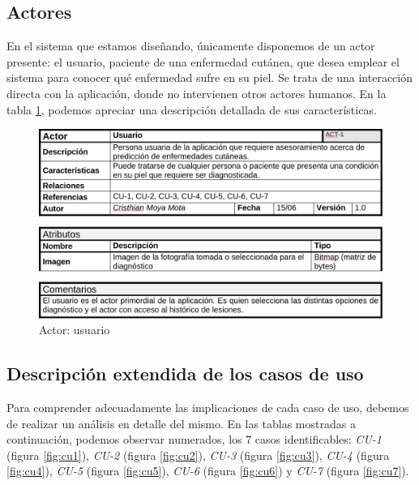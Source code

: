 \subsection{Actores}

En el sistema que estamos diseñando, únicamente disponemos de un actor presente: el usuario, paciente de una enfermedad cutánea, que desea emplear el sistema para conocer qué enfermedad sufre en su piel. Se trata de una interacción directa con la aplicación, donde no intervienen otros actores humanos. En la tabla \ref{fig:actorusuario}, podemos apreciar una descripción detallada de sus características.

  \begin{figure}[H]
	\centering
	\includegraphics[scale = 0.2]{imagenes/tablausuario.png}
	\caption{Actor: usuario}
	\label{fig:actorusuario}
\end{figure}

\subsection	{Descripción extendida de los casos de uso}

Para comprender adecuadamente las implicaciones de cada caso de uso, debemos de realizar un análisis en detalle del mismo. En las tablas mostradas a continuación, podemos observar numerados, los 7 casos identificables: \textit{CU-1} (figura \ref{fig:cu1}), \textit{CU-2} (figura \ref{fig:cu2}), \textit{CU-3} (figura \ref{fig:cu3}), \textit{CU-4} (figura \ref{fig:cu4}), \textit{CU-5} (figura \ref{fig:cu5}), \textit{CU-6} (figura \ref{fig:cu6}) y \textit{CU-7} (figura \ref{fig:cu7}).

